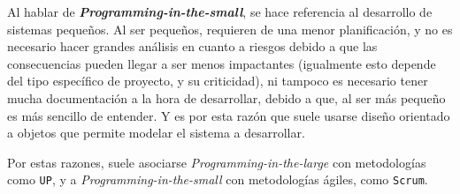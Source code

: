 Al hablar de \emph{\textbf{Programming-in-the-small}}, se hace referencia al desarrollo de sistemas pequeños. Al ser pequeños, requieren de una menor planificación, y no es necesario hacer grandes análisis en cuanto a riesgos debido a que las consecuencias  pueden llegar a ser menos impactantes (igualmente esto depende del tipo específico de proyecto, y su criticidad), ni tampoco es necesario tener mucha documentación a la hora de desarrollar, debido a que, al ser más pequeño es más sencillo de entender.
Y es por esta razón que suele usarse diseño orientado a objetos que permite modelar el sistema a desarrollar.

Por estas razones, suele asociarse \emph{Programming-in-the-large} con metodologías como \texttt{UP}, y a \emph{Programming-in-the-small} con metodologías ágiles, como \texttt{Scrum}.